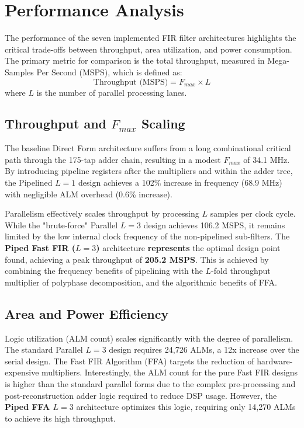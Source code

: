\documentclass[12pt]{article}
\begin{document}
\section{Performance Analysis}
The performance of the seven implemented FIR filter architectures highlights the critical trade-offs between throughput, area utilization, and power consumption. The primary metric for comparison is the total throughput, measured in Mega-Samples Per Second (MSPS), which is defined as:
\begin{equation}
    \text{Throughput (MSPS)} = F_{max} \times L
\end{equation}
where $L$ is the number of parallel processing lanes.

\subsection{Throughput and \texorpdfstring{$F_{max}$}{Fmax} Scaling}
The baseline Direct Form architecture suffers from a long combinational critical path through the 175-tap adder chain, resulting in a modest $F_{max}$ of 34.1 MHz. By introducing pipeline registers after the multipliers and within the adder tree, the Pipelined $L=1$ design achieves a 102\% increase in frequency (68.9 MHz) with negligible ALM overhead (0.6\% increase).

Parallelism effectively scales throughput by processing $L$ samples per clock cycle. While the "brute-force" Parallel $L=3$ design achieves 106.2 MSPS, it remains limited by the low internal clock frequency of the non-pipelined sub-filters. The \textbf{Piped Fast FIR ($L=3$)} architecture \textbf{represents} the optimal design point found, achieving a peak throughput of \textbf{205.2 MSPS}. This is achieved by combining the frequency benefits of pipelining with the $L$-fold throughput multiplier of polyphase decomposition, and the algorithmic benefits of FFA.

\subsection{Area and Power Efficiency}
Logic utilization (ALM count) scales significantly with the degree of parallelism. The standard Parallel $L=3$ design requires 24,726 ALMs, a 12x increase over the serial design. The Fast FIR Algorithm (FFA) targets the reduction of hardware-expensive multipliers. Interestingly, the ALM count for the pure Fast FIR designs is higher than the standard parallel forms due to the complex pre-processing and post-reconstruction adder logic required to reduce DSP usage. However, the \textbf{Piped FFA $L=3$} architecture optimizes this logic, requiring only 14,270 ALMs to achieve its high throughput.
\end{document}
